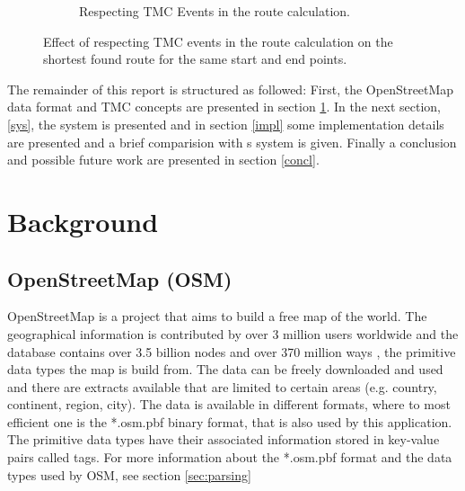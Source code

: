 \documentclass[a4paper]{scrartcl}
\begin{document}
\begin{figure}
\begin{subfigure}[b]{0.4\textwidth}
        \caption{Respecting TMC Events in the route calculation.}
        \label{fig:with_tmc}
    \end{subfigure}
    \caption{Effect of respecting TMC events in the route calculation on the shortest found route for the same start and end points.}\label{fig:tmc_comp}
\end{figure}

The remainder of this report is structured as followed: First, the OpenStreetMap data format and TMC concepts are presented in section \ref{bg}. In the next section, \ref{sys}, the system is presented and in section \ref{impl} some implementation details are presented and a brief comparision with \citeauthor{sanwald2013}s system is given. Finally a conclusion and possible future work are presented in section \ref{concl}.

\section{Background}
\label{bg}
\subsection{OpenStreetMap (OSM)}
OpenStreetMap \cite{osm_main} is a project that aims to build a free map of the world. The geographical information is contributed by over 3 million users worldwide and the database contains over 3.5 billion nodes and over 370 million ways \cite{osm_stats}, the primitive data types the map is build from. The data can be freely downloaded and used and there are extracts available that are limited to certain areas (e.g. country, continent, region, city). The data is available in different formats, where to most efficient one is the *.osm.pbf binary format, that is also used by this application. The primitive data types have their associated information stored in key-value pairs called tags. For more information about the *.osm.pbf format and the data types used by OSM, see section \ref{sec:parsing}
\end{document}
